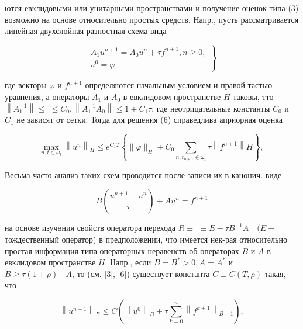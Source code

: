 \documentclass[10pt]{article}
\begin{document}
ются евклидовыми или унитарными пространствами и получение оценок типа (3) возможно на основе относительно простых средств. Напр., пусть рассматривается линейная двухслойная разностная схема вида



\[

\left.\begin{array}{c}

A_{1} u^{n+1}=A_{0} u^{n}+\tau f^{n+1}, n \geqslant 0, \\

u^{0}=\varphi

\end{array}\right\}

\]



где векторы $\varphi$ и $f^{n+1}$ определяются начальным условием и правой тастью уравнения, а операторы $A_{1}$ и $A_{0}$ в евклидовом пространстве $H$ таковы, тто $\left\|A_{1}^{-1}\right\| \leqslant$ $\leqslant C_{0},\left\|A_{1}^{-1} A_{0}\right\| \leqslant 1+C_{1} \tau$, где неотрицательные константы $C_{0}$ и $C_{1}$ не зависят от сетки. Тогда для решения (6) справедлива априорная оценка



\[

\max _{n, t \in \omega_{t}}\left\|u^{n}\right\|_{H} \leqslant e^{C_{1} T}\left\{\|\varphi\|_{H}+C_{0} \sum_{n, t_{n+1} \in \omega_{t}} \tau\left\|f^{n+1}\right\| H\right\} \text {, }

\]



Весьма часто анализ таких схем проводится после записи их в канонич. виде



\[

B\left(\frac{u^{n+1}-u^{n}}{\tau}\right)+A u^{n}=f^{n+1}

\]



на основе изучөния свойств оператора перехода $R \equiv$ $\equiv E-\tau B^{-1} A \quad(E-$ тождественный оператор) в предположении, что имеется нек-рая относительно простая информация типа операторных неравенств об операторах $B$ и $A$ в евклидовом пространстве $H$. Напр., если $B=B^{*}>0, A=A^{*}$ и $B \geqslant \tau(1+\rho)^{-1} A$, то (см. [3], [6]) существует константа $C \equiv C(T, \rho)$ такая, что



\[

\left\|u^{n+1}\right\|_{B} \leqslant C\left(\left\|u^{0}\right\|_{B}+\tau \sum_{k=0}^{n}\left\|f^{k+1}\right\|_{B-1}\right),

\]
\end{document}
